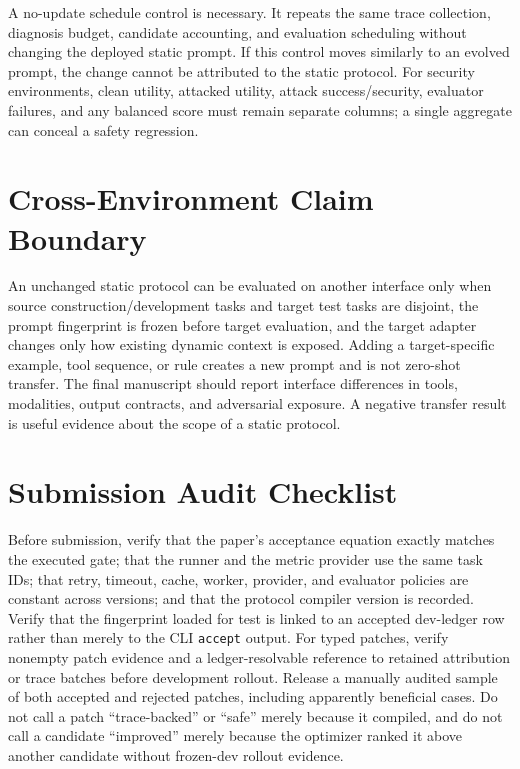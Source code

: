 \documentclass[10pt]{article}
\begin{document}
A no-update schedule control is necessary. It repeats the same trace collection, diagnosis budget, candidate accounting, and evaluation scheduling without changing the deployed static prompt. If this control moves similarly to an evolved prompt, the change cannot be attributed to the static protocol. For security environments, clean utility, attacked utility, attack success/security, evaluator failures, and any balanced score must remain separate columns; a single aggregate can conceal a safety regression.

\section{Cross-Environment Claim Boundary}
An unchanged static protocol can be evaluated on another interface only when source construction/development tasks and target test tasks are disjoint, the prompt fingerprint is frozen before target evaluation, and the target adapter changes only how existing dynamic context is exposed. Adding a target-specific example, tool sequence, or rule creates a new prompt and is not zero-shot transfer. The final manuscript should report interface differences in tools, modalities, output contracts, and adversarial exposure. A negative transfer result is useful evidence about the scope of a static protocol.

\section{Submission Audit Checklist}
Before submission, verify that the paper's acceptance equation exactly matches the executed gate; that the runner and the metric provider use the same task IDs; that retry, timeout, cache, worker, provider, and evaluator policies are constant across versions; and that the protocol compiler version is recorded. Verify that the fingerprint loaded for test is linked to an accepted dev-ledger row rather than merely to the CLI \texttt{accept} output. For typed patches, verify nonempty patch evidence and a ledger-resolvable reference to retained attribution or trace batches before development rollout. Release a manually audited sample of both accepted and rejected patches, including apparently beneficial cases. Do not call a patch ``trace-backed'' or ``safe'' merely because it compiled, and do not call a candidate ``improved'' merely because the optimizer ranked it above another candidate without frozen-dev rollout evidence.
\end{document}
